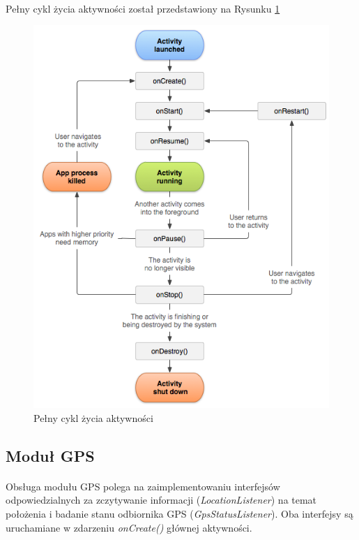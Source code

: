 \paragraph{} 
Pełny cykl życia aktywności został przedstawiony na Rysunku \ref{fig:activity_lifecycle}

\begin{figure}[ht]
	\centering
		\includegraphics[width=0.7\linewidth]{assets/activity_lifecycle.png}
		\caption{Pełny cykl życia aktywności}
	\label{fig:activity_lifecycle}
\end{figure}

\subsection{Moduł GPS} %
\label{sub:modu_gps}

\paragraph{} %
\label{par:}
Obsługa modułu GPS polega na zaimplementowaniu interfejsów odpowiedzialnych za zczytywanie informacji (\textit{LocationListener}) na temat położenia i badanie stanu odbiornika GPS (\textit{GpsStatusListener}). Oba interfejsy są uruchamiane w zdarzeniu \textit{onCreate()} głównej aktywności. 

